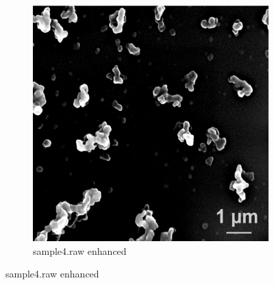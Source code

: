 \documentclass{article}
\begin{document}
\begin{figure}[!htb]
\begin{subfigure}[b]{0.3\textwidth}
        \includegraphics[width=\textwidth]{img/I4_EC.png}
        \caption{sample4.raw enhanced}
    \end{subfigure}



\end{figure}
\end{document}
